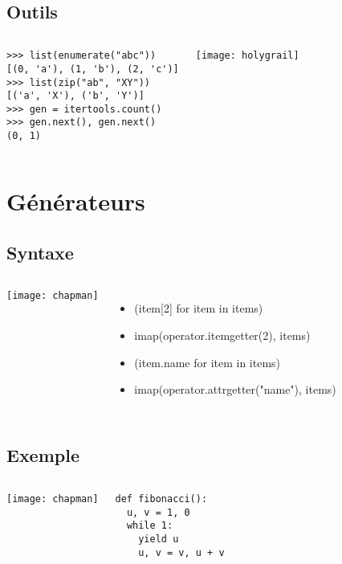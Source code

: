 \documentclass[handout]{beamer}
\begin{document}
\subsection{Outils}
\begin{frame}[fragile]
    \begin{columns}[c]
        \begin{verbatim}
>>> list(enumerate("abc"))
[(0, 'a'), (1, 'b'), (2, 'c')]
>>> list(zip("ab", "XY"))
[('a', 'X'), ('b', 'Y')]
>>> gen = itertools.count()
>>> gen.next(), gen.next()
(0, 1)
        \end{verbatim}
        \texttt{[image: holygrail]}
    \end{columns}
\end{frame}

\section{Générateurs}

\subsection{Syntaxe}
\begin{frame}
    \begin{columns}[c]
        \texttt{[image: chapman]}
        \begin{itemize}
        \item (item[2] for item in items)
        \item imap(operator.itemgetter(2), items)
        \item (item.name for item in items)
        \item imap(operator.attrgetter("name"), items)
        \end{itemize}
    \end{columns}
\end{frame}

\subsection{Exemple}
\begin{frame}[fragile]
    \begin{columns}[c]
        \texttt{[image: chapman]}
        \begin{verbatim}
def fibonacci():
  u, v = 1, 0
  while 1:
    yield u
    u, v = v, u + v
        \end{verbatim}
    \end{columns}
\end{frame}
\end{document}

